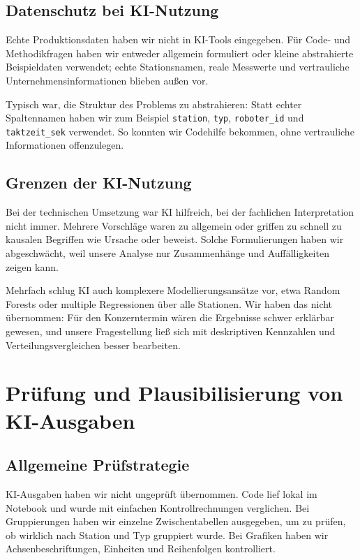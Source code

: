 \documentclass[a4paper, 11pt]{article}
\begin{document}
\subsection{Datenschutz bei KI-Nutzung}

Echte Produktionsdaten haben wir nicht in KI-Tools eingegeben. Für Code- und Methodikfragen haben wir entweder allgemein formuliert oder kleine abstrahierte Beispieldaten verwendet; echte Stationsnamen, reale Messwerte und vertrauliche Unternehmensinformationen blieben außen vor.

Typisch war, die Struktur des Problems zu abstrahieren: Statt echter Spaltennamen haben wir zum Beispiel \texttt{station}, \texttt{typ}, \texttt{roboter\_id} und \texttt{taktzeit\_sek} verwendet. So konnten wir Codehilfe bekommen, ohne vertrauliche Informationen offenzulegen.

\subsection{Grenzen der KI-Nutzung}

Bei der technischen Umsetzung war KI hilfreich, bei der fachlichen Interpretation nicht immer. Mehrere Vorschläge waren zu allgemein oder griffen zu schnell zu kausalen Begriffen wie \glqq Ursache\grqq{} oder \glqq beweist\grqq{}. Solche Formulierungen haben wir abgeschwächt, weil unsere Analyse nur Zusammenhänge und Auffälligkeiten zeigen kann.

Mehrfach schlug KI auch komplexere Modellierungsansätze vor, etwa Random Forests oder multiple Regressionen über alle Stationen. Wir haben das nicht übernommen: Für den Konzerntermin wären die Ergebnisse schwer erklärbar gewesen, und unsere Fragestellung ließ sich mit deskriptiven Kennzahlen und Verteilungsvergleichen besser bearbeiten.

\section{Prüfung und Plausibilisierung von KI-Ausgaben}

\subsection{Allgemeine Prüfstrategie}

KI-Ausgaben haben wir nicht ungeprüft übernommen. Code lief lokal im Notebook und wurde mit einfachen Kontrollrechnungen verglichen. Bei Gruppierungen haben wir einzelne Zwischentabellen ausgegeben, um zu prüfen, ob wirklich nach Station und Typ gruppiert wurde. Bei Grafiken haben wir Achsenbeschriftungen, Einheiten und Reihenfolgen kontrolliert.
\end{document}
